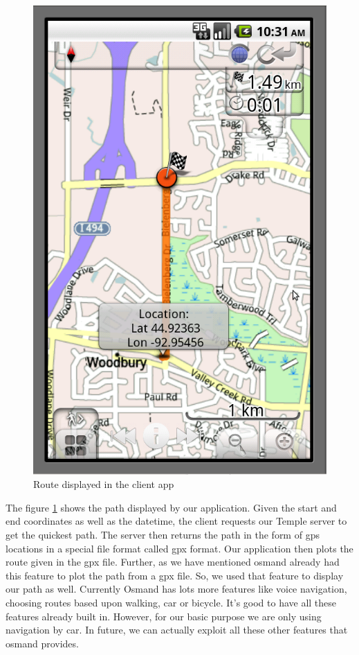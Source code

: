 \documentclass[a4paper,12pt, notitlepage, oneside, onecolumn]{article}
\begin{document}
\begin{figure}[H]
\begin{minipage}[b]{0.5\linewidth}
\centering
\includegraphics[scale=0.3]{route.png}
\caption{Route displayed in the client app}
\label{fig:route}
\end{minipage}
\centering
\end{figure}

The figure \ref{fig:route} shows the path displayed by our application. Given the start and end coordinates as well as the datetime, the client requests our Temple server to get the quickest path. The server then returns the path in the form of gps locations in a special file format called gpx format. Our application then plots the route given in the gpx file. Further, as we have mentioned osmand already had this feature to plot the path from a gpx file. So, we used that feature to display our path as well. Currently Osmand has lots more features like voice navigation, choosing routes based upon walking, car or bicycle. It's good to have all these features already built in. However, for our basic purpose we are only using navigation by car. In future, we can actually exploit all these other features that osmand provides.
\end{document}
